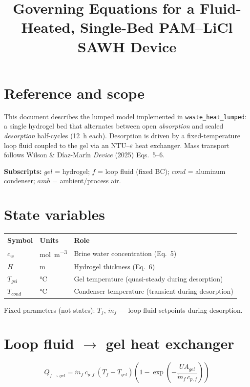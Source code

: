 \documentclass[11pt]{article}
\title{Governing Equations for a Fluid-Heated, Single-Bed PAM--LiCl SAWH Device}
\author{}
\date{}
\begin{document}
\maketitle

\section*{Reference and scope}

This document describes the lumped model implemented in \texttt{waste\_heat\_lumped}: a single hydrogel bed that alternates between open \emph{absorption} and sealed \emph{desorption} half-cycles (12~h each). Desorption is driven by a fixed-temperature loop fluid coupled to the gel via an NTU--$\varepsilon$ heat exchanger. Mass transport follows Wilson \& D\'{i}az-Mar\'{i}n \textit{Device} (2025) Eqs.~5--6.

\textbf{Subscripts:} $gel$ = hydrogel; $f$ = loop fluid (fixed BC); $cond$ = aluminum condenser; $amb$ = ambient/process air.

\section{State variables}

\begin{table}[h]
\centering
\small
\begin{tabular}{@{}lll@{}}
\toprule
\textbf{Symbol} & \textbf{Units} & \textbf{Role} \\
\midrule
$c_w$ & \si{\mol\per\cubic\metre} & Brine water concentration (Eq.~5) \\
$H$ & \si{\metre} & Hydrogel thickness (Eq.~6) \\
$T_{gel}$ & \si{\celsius} & Gel temperature (quasi-steady during desorption) \\
$T_{cond}$ & \si{\celsius} & Condenser temperature (transient during desorption) \\
\bottomrule
\end{tabular}
\end{table}

Fixed parameters (not states): $T_f$, $\dot{m}_f$ --- loop fluid setpoints during desorption.

\section{Loop fluid $\to$ gel heat exchanger}

\[
Q_{f \to gel} = \dot{m}_f\, c_{p,f}\, (T_f - T_{gel})
\left(1 - \exp\!\left(-\frac{UA_{gel}}{\dot{m}_f\, c_{p,f}}\right)\right)
\]
\end{document}
